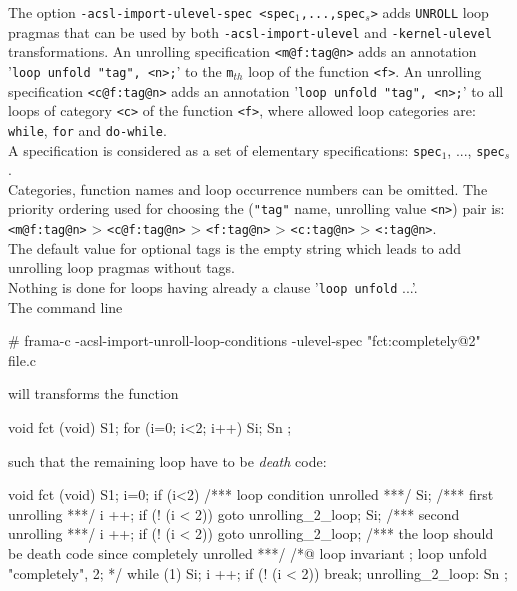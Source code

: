 \documentclass{frama-c-book}
\begin{document}
The option {\tt\/-acsl-import-ulevel-spec <spec$_{1}$,...,spec$_{s}$>} adds \verb|UNROLL| loop pragmas that can be used by both  \verb|-acsl-import-ulevel| and \verb|-kernel-ulevel| transformations.
An unrolling specification \verb|<m@f:tag@n>| adds an annotation '{\tt\/loop unfold "tag", <n>;}' to the {\tt m$_{th}$} loop of the function \verb|<f>|.
An unrolling specification \verb|<c@f:tag@n>| adds an annotation '{\tt\/loop unfold "tag", <n>;}' to all loops of category \verb|<c>| of the function \verb|<f>|, where allowed loop categories are: \verb|while|, \verb|for| and \verb|do-while|.\\
A specification is considered as a set of elementary specifications: {\tt\/spec$_{1}$}, ..., {\tt\/spec$_{s}$}.\\
Categories, function names and loop occurrence numbers can be omitted.
The priority ordering used for choosing the (\verb|"tag"| name, unrolling value \verb|<n>|) pair is: \verb|<m@f:tag@n>| > \verb|<c@f:tag@n>| > \verb|<f:tag@n>| > \verb|<c:tag@n>| > \verb|<:tag@n>|.\\
The default value for optional tags is the empty string which leads to add unrolling loop pragmas without tags.\\
Nothing is done for loops having already a clause '{\tt\/loop unfold} ...'.\\


The command line
\begin{shell}
# frama-c -acsl-import-unroll-loop-conditions -ulevel-spec "fct:completely@2" file.c
\end{shell}
 will transforms the function
\begin{shell}
void fct (void) {
  S1;
  for (i=0; i<2; i++)
    Si;
  Sn ;
}
\end{shell}
such that the remaining loop have to be {\sl death} code:
\begin{shell}
void fct (void) {
  S1;
  i=0;
  if (i<2){ /*** loop condition unrolled ***/
    Si;     /*** first unrolling ***/
    i ++;
    if (! (i < 2)) goto unrolling_2_loop;
      Si;   /*** second unrolling ***/
      i ++;
      if (! (i < 2)) { goto unrolling_2_loop; }
      /*** the loop should be death code since completely unrolled ***/
      /*@ loop invariant \false;
          loop unfold "completely", 2; */
      while (1) {
        Si;
        i ++;
        if (! (i < 2)) break;
        }
unrolling_2_loop:
    }
  Sn ;
}
\end{shell}

\appendix





\cleardoublepage
\end{document}
